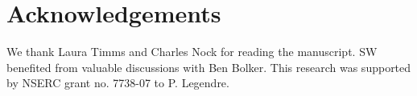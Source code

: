 \documentclass[12pt]{ecology}
\begin{document}





\section*{Acknowledgements}

We thank Laura Timms and Charles Nock for reading the manuscript.  SW benefited from valuable discussions with Ben Bolker.  This research was supported by NSERC grant no. 7738-07 to P. Legendre.




\makeatletter \renewcommand{\@dotsep}{10000} \makeatother   %
\clearpage    %

\listoffigures
\end{document}
